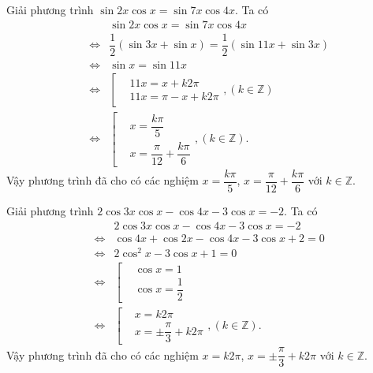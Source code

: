\begin{bt}%

	Giải phương trình $\sin 2x\cos x=\sin 7x\cos 4x$.
	\loigiai
	{
		Ta có
		\allowdisplaybreaks
		\begin{eqnarray*}
			&& \sin 2x\cos x=\sin 7x\cos 4x \\
			&\Leftrightarrow & \dfrac{1}{2}\left(\sin 3x + \sin x\right) = \dfrac{1}{2}\left(\sin 11x + \sin 3x\right)\\
			&\Leftrightarrow & \sin x = \sin 11x \\
			&\Leftrightarrow & \left[\begin{aligned}&11x=x+k2\pi	\\&11x=\pi-x+k2\pi\end{aligned}\right. , \left(k\in\mathbb{Z}\right)\\
			&\Leftrightarrow & \left[\begin{aligned}&x=\dfrac{k\pi}{5}	\\&x=\dfrac{\pi}{12}+\dfrac{k\pi}{6}\end{aligned}\right. , \left(k\in\mathbb{Z}\right).
		\end{eqnarray*}
		Vậy phương trình đã cho có các nghiệm $x=\dfrac{k\pi}{5}$, $x=\dfrac{\pi}{12}+\dfrac{k\pi}{6}$ với $k\in\mathbb{Z}$.
	}
\end{bt}

\begin{bt}%

	Giải phương trình $2\cos 3x\cos x-\cos 4x-3\cos x=-2$.
	\loigiai
	{
		Ta có
		\allowdisplaybreaks
		\begin{eqnarray*}
			&& 2\cos 3x\cos x-\cos 4x-3\cos x=-2 \\
			&\Leftrightarrow & \cos 4x + \cos 2x - \cos 4x -3\cos x + 2=0 \\
			&\Leftrightarrow & 2\cos^2 x-3\cos x+1=0 \\
			&\Leftrightarrow & \left[\begin{aligned}&\cos x=1 \\&\cos x=\dfrac{1}{2}\end{aligned}\right. \\
			&\Leftrightarrow & \left[\begin{aligned}&x=k2\pi \\&x=\pm\dfrac{\pi}{3}+k2\pi\end{aligned}\right. , \left(k\in\mathbb{Z}\right).
		\end{eqnarray*}
		Vậy phương trình đã cho có các nghiệm $x=k2\pi$, $x=\pm\dfrac{\pi}{3}+k2\pi$ với $k\in\mathbb{Z}$.
	}
\end{bt}

